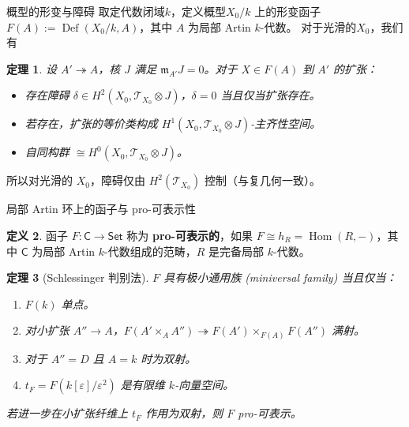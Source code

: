 \documentclass{beamer}
\theoremstyle{definition}
\newtheorem{defn}{定义}[section]
\theoremstyle{plain}
\newtheorem{thm}[defn]{定理}
\begin{document}
\begin{frame}{概型的形变与障碍}
取定代数闭域$ k $，定义概型$X_0/k$ 上的形变函子 $F(A):=\operatorname{Def}(X_0/k,A)$，其中 $A$ 为局部 Artin $k$-代数。
对于光滑的$ X_0 $，我们有
\begin{thm}
设 $A'\twoheadrightarrow A$，核 $J$ 满足 $\mathfrak{m}_{A'}J=0$。对于 $X\in F(A)$ 到 $A'$ 的扩张：
\begin{itemize}
    \item 存在障碍 $\delta\in H^2(X_0,\mathcal{T}_{X_0}\otimes J)$，$\delta=0$ 当且仅当扩张存在。
    \item 若存在，扩张的等价类构成 $H^1(X_0,\mathcal{T}_{X_0}\otimes J)$-主齐性空间。
    \item 自同构群 $\cong H^0(X_0,\mathcal{T}_{X_0}\otimes J)$。
\end{itemize}
\end{thm}
所以对光滑的 $X_0$，障碍仅由 $H^2(\mathcal{T}_{X_0})$ 控制（与复几何一致）。
\end{frame}

\begin{frame}{局部 Artin 环上的函子与 pro-可表示性}
\begin{defn}
函子 $F:\mathsf{C}\to\mathsf{Set}$ 称为 \textbf{pro-可表示的}，如果 $F\cong h_R=\operatorname{Hom}(R,-)$，其中 $\mathsf{C}$ 为局部 Artin $k$-代数组成的范畴，$R$ 是完备局部 $k$-代数。
\end{defn}
\vspace{-5pt}
\begin{thm}[Schlessinger 判别法]
$F$ 具有极小通用族 (miniversal family) 当且仅当：
\begin{enumerate}
    \item[H0] $F(k)$ 单点。
    \item[H1] 对小扩张 $A''\to A$，$F(A'\times_A A'')\twoheadrightarrow F(A')\times_{F(A)}F(A'')$ 满射。
    \item[H2] 对于 $A''=D$ 且 $A=k$ 时为双射。
    \item[H3] $t_F=F(k[\varepsilon]/\varepsilon^2)$ 是有限维 $k$-向量空间。
\end{enumerate}
若进一步在小扩张纤维上 $t_F$ 作用为双射，则 $F$ pro-可表示。
\end{thm}
\end{frame}
\end{document}
